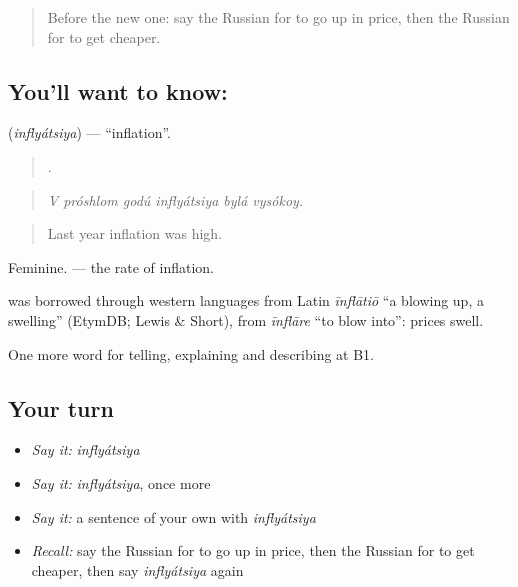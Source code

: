 \label{lesson:RU-C396-inflyaciya}



\begin{quote}
Before the new one: say the Russian for to go up in price, then the Russian for to get cheaper.
\end{quote}

\subsection*{You'll want to know: }
\textbf{} (\emph{inflyátsiya}) — \textquotedblleft{}inflation\textquotedblright{}.

\begin{quote}
     .
\end{quote}

\begin{quote}
\emph{V próshlom godú inflyátsiya bylá vysókoy.}
\end{quote}

\begin{quote}
Last year inflation was high.
\end{quote}

Feminine. \emph{ } — the rate of inflation.

\begin{cousinweb}
\textbf{} was borrowed through western languages from Latin \emph{īnflātiō} \textquotedblleft{}a blowing up, a swelling\textquotedblright{} (EtymDB; Lewis \& Short), from \emph{īnflāre} \textquotedblleft{}to blow into\textquotedblright{}: prices swell.
\end{cousinweb}

\begin{grammarlens}[title={What you've built}]
One more word for telling, explaining and describing at B1.
\end{grammarlens}

\subsection*{Your turn}
\begin{itemize}
\raggedright
  \item \emph{Say it:} \emph{inflyátsiya}
  \item \emph{Say it:} \emph{inflyátsiya}, once more
  \item \emph{Say it:} a sentence of your own with \emph{inflyátsiya}
  \item \emph{Recall:} say the Russian for to go up in price, then the Russian for to get cheaper, then say \emph{inflyátsiya} again
\end{itemize}

